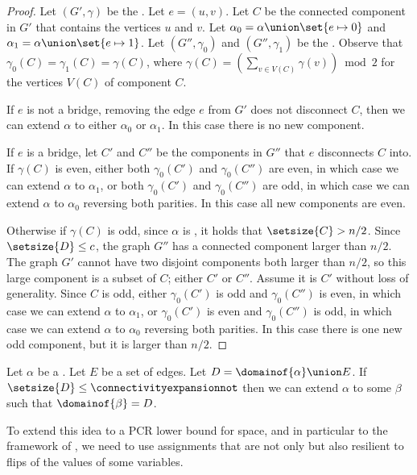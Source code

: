 \begin{proof}
  Let $(G',\gamma)$ be the \inducedgraph{$\alpha$}. Let $e=(u,v)$. Let $C$ be the connected component in $G'$ that contains the vertices $u$ and $v$. Let $\alpha_0=\alpha\union\set{e\mapsto 0}$ and $\alpha_1=\alpha\union\set{e\mapsto 1}$. Let $(G'',\gamma_0)$ and $(G'',\gamma_1)$ be the . Observe that $\gamma_0(C)=\gamma_1(C)=\gamma(C)$, where $\gamma(C) = \left(\sum_{v \in V(C)} \gamma(v)\right) \bmod 2$ for the vertices $V(C)$ of component $C$.

If $e$ is not a bridge, \ieComma removing the edge $e$ from $G'$ does not disconnect $C$, then we can extend $\alpha$ to either $\alpha_0$ or $\alpha_1$. In this case there is no new component.

If $e$ is a bridge, let $C'$ and $C''$ be the components in $G''$ that $e$ disconnects $C$ into. If $\gamma(C)$ is even, either both $\gamma_0(C')$ and $\gamma_0(C'')$ are even, in which case we can extend $\alpha$ to $\alpha_1$, or both $\gamma_0(C')$ and $\gamma_0(C'')$ are odd, in which case we can extend $\alpha$ to $\alpha_0$ reversing both parities. In this case all new components are even.

Otherwise if $\gamma(C)$ is odd, since $\alpha$ is \nonsplitting, it holds that $\setsize{C}>n/2$. Since $\setsize{D}\leq c$, the graph $G''$ has a connected component larger than $n/2$. The graph $G'$ cannot have two disjoint components both larger than $n/2$, so this large component is a subset of $C$; either $C'$ or $C''$. Assume it is $C'$ without loss of generality. Since $C$ is odd, either $\gamma_0(C')$ is odd and $\gamma_0(C'')$ is even, in which case we can extend $\alpha$ to $\alpha_1$, or $\gamma_0(C')$ is even and $\gamma_0(C'')$ is odd, in which case we can extend $\alpha$ to $\alpha_0$ reversing both parities. In this case there is one new odd component, but it is larger than $n/2$.
\end{proof}
\begin{corollary}
  \label{cor:extend-non-splitting}
  Let $\alpha$ be a \nonsplittingassignment. Let $E$ be a set of edges. Let $D=\domainof{\alpha}\union E$. If $\setsize{D}\leq \connectivityexpansionnot$ then we can extend $\alpha$ to some \nonsplittingassignment $\beta$ such that $\domainof{\beta}=D$.
\end{corollary}

To extend this idea to a PCR lower bound for space, and in particular to the framework of \cite{BG15Framework}, we need to use assignments that are not only \nonsplitting{} but also resilient to flips of the values of some variables.

